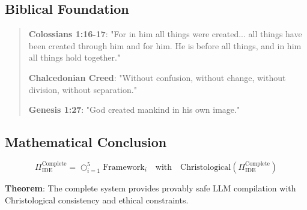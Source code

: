 \documentclass[12pt]{article}
\begin{document}
\subsection{Biblical Foundation}
\begin{quote}
\textbf{Colossians 1:16-17}: "For in him all things were created... all things have been created through him and for him. He is before all things, and in him all things hold together."

\textbf{Chalcedonian Creed}: "Without confusion, without change, without division, without separation."

\textbf{Genesis 1:27}: "God created mankind in his own image."
\end{quote}

\subsection{Mathematical Conclusion}
\[
\Pi_{\text{IDE}}^{\text{Complete}} = \bigcirc_{i=1}^{5} \text{Framework}_i \quad \text{with} \quad \text{Christological}(\Pi_{\text{IDE}}^{\text{Complete}})
\]

\noindent
\textbf{Theorem}: The complete system provides provably safe LLM compilation with Christological consistency and ethical constraints.
\end{document}
